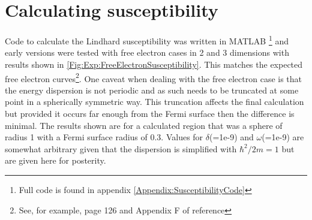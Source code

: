 \section{Calculating susceptibility}
    \label{Sec:Exp:Susceptibility}

Code to calculate the Lindhard susceptibility was written in MATLAB \footnote{Full code is found in appendix \ref{Appendix:SusceptibilityCode}} and early versions were tested with free electron cases in 2 and 3 dimensions with results shown in \fig\ref{Fig:Exp:FreeElectronSusceptibility}. This matches the expected free electron curves\footnote{See, for example, page 126 and Appendix F of reference\cite{Dressel2002}}. One caveat when dealing with the free electron case is that the energy dispersion is not periodic and as such needs to be truncated at some point in a spherically symmetric way. This truncation affects the final calculation but provided it occurs far enough from the Fermi surface then the difference is minimal. The results shown are for a calculated region that was a sphere of radius 1 with a Fermi surface radius of 0.3. Values for $\delta$(=1e-9) and $\omega$(=1e-9) are somewhat arbitrary given that the dispersion is simplified with $\hbar^2/2m = 1$ but are given here for posterity. 


